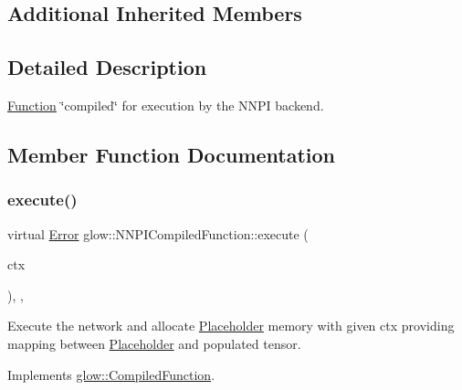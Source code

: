 \subsection*{Additional Inherited Members}


\subsection{Detailed Description}
\hyperlink{classglow_1_1_function}{Function} \char`\"{}compiled\char`\"{} for execution by the N\+N\+PI backend. 

\subsection{Member Function Documentation}
\mbox{\label{classglow_1_1_n_n_p_i_compiled_function_a60c241e9e44d70fe5486c44f5cddb7e6}} 
\subsubsection{\texorpdfstring{execute()}{execute()}}
{\footnotesize\ttfamily virtual \hyperlink{namespaceglow_afdb176c3a672ef66db0ecfc19a8d39bf}{Error} glow\+::\+N\+N\+P\+I\+Compiled\+Function\+::execute (\begin{DoxyParamCaption}\item[{\hyperlink{classglow_1_1_execution_context}{Execution\+Context} $\ast$}]{ctx }\end{DoxyParamCaption})\hspace{0.3cm}{\ttfamily [inline]}, {\ttfamily [override]}, {\ttfamily [virtual]}}

Execute the network and allocate \hyperlink{classglow_1_1_placeholder}{Placeholder} memory with given {\ttfamily ctx} providing mapping between \hyperlink{classglow_1_1_placeholder}{Placeholder} and populated tensor. 

Implements \hyperlink{classglow_1_1_compiled_function_ac8dd94f2ee7129a435f1701b6a9f419e}{glow\+::\+Compiled\+Function}.

\mbox{\label{classglow_1_1_n_n_p_i_compiled_function_aa1e428414a8a7183835f9293903682fb}} 
